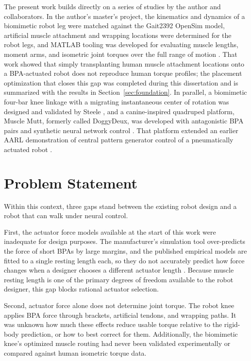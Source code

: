 The present work builds directly on a series of studies by the author and collaborators. In the author's master's project, the kinematics and dynamics of a biomimetic robot leg were matched against the Gait2392 OpenSim model, artificial muscle attachment and wrapping locations were determined for the robot legs, and MATLAB tooling was developed for evaluating muscle lengths, moment arms, and isometric joint torques over the full range of motion \citep{bolen_bipedal_2019, bolen_determination_2019}. That work showed that simply transplanting human muscle attachment locations onto a BPA-actuated robot does not reproduce human torque profiles; the placement optimization that closes this gap was completed during this dissertation and is summarized with the results in Section~\ref{sec:foundation}. In parallel, a biomimetic four-bar knee linkage with a migrating instantaneous center of rotation was designed and validated by Steele \citep{steele_development_2017, steele_biomimetic_2018, steele_biomimetic_2018-1}, and a canine-inspired quadruped platform, Muscle Mutt, formerly called DoggyDeux, was developed with antagonistic BPA pairs and synthetic neural network control \citep{scharzenberger_design_2019}. That platform extended an earlier AARL demonstration of central pattern generator control of a pneumatically actuated robot \citep{hunt_development_2017}.

\section{Problem Statement}\label{sec:problem}

Within this context, three gaps stand between the existing robot design and a robot that can walk under neural control.

First, the actuator force models available at the start of this work were inadequate for design purposes. The manufacturer's simulation tool over-predicts the force of short BPAs by large margins, and the published empirical models are fitted to a single resting length each, so they do not accurately predict how force changes when a designer chooses a different actuator length \citep{sarosi_comparative_2017, martens_modeling_2017, hunt_modeling_2017}. Because muscle resting length is one of the primary degrees of freedom available to the robot designer, this gap blocks rational actuator selection.

Second, actuator force alone does not determine joint torque. The robot knee applies BPA force through brackets, artificial tendons, and wrapping paths. It was unknown how much these effects reduce usable torque relative to the rigid-body prediction, or how to best correct for them. Additionally, the biomimetic knee's optimized muscle routing \citep{morrow_optimization_2020} had never been validated experimentally or compared against human isometric torque data.

